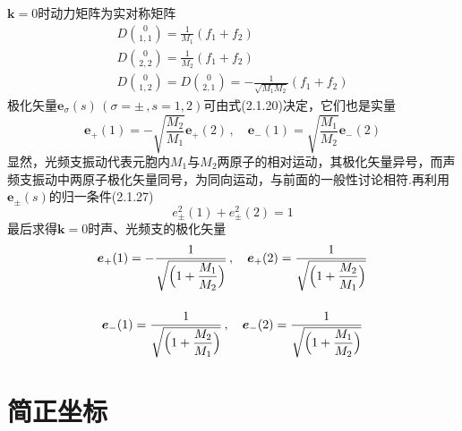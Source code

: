 $\boldsymbol{k}=0$时动力矩阵为实对称矩阵
\begin{equation}
\begin{gathered}
  D\binom{0}{1,1}=\frac{1}{M_1}(f_1+f_2)\\[1ex]
  D\binom{0}{2,2}=\frac{1}{M_2}(f_1+f_2)\\[1ex]
  D\binom{0}{1,2}=D\binom{0}{2,1}
  =-\frac{1}{\sqrt{M_1M_2}}(f_1+f_2)
\end{gathered}
\end{equation}
极化矢量$\boldsymbol{e}_{\sigma}(s)\,(\sigma=\pm\,,s=1,2)$可由式(2.1.20)决定，它们也是实量
\begin{equation}
  \boldsymbol{e}_{+}(1)=-\sqrt{\frac{M_2}{M_1}}\boldsymbol{e}_{+}(2)\,,
  \quad\boldsymbol{e}_{-}(1)=\sqrt{\frac{M_1}{M_2}}\boldsymbol{e}_{-}(2)
\end{equation}
显然，光频支振动代表元胞内$M_1$与$M_2$两原子的相对运动，其极化矢量异号，而声频支振动中两原子极化矢量同号，为同向运动，与前面的一般性讨论相符.再利用$\boldsymbol{e}_{\pm}(s)$的归一条件(2.1.27)
\begin{equation}
  e_{\pm}^2(1)+e_{\pm}^2(2)=1
\end{equation}
最后求得$\boldsymbol{k}=0$时声、光频支的极化矢量
\begin{equation}
\begin{gathered}
  \boldsymbol{e}_{+}(1)=-\frac{1}{\sqrt{\Bigl(1+\dfrac{M_1}{M_2}\Bigr)}}\,,
  \quad\boldsymbol{e}_{+}(2)=\frac{1}{\sqrt{\Bigl(1+\dfrac{M_2}{M_1}\Bigr)}}\\[3ex]
  \boldsymbol{e}_{-}(1)=\frac{1}{\sqrt{\Bigl(1+\dfrac{M_2}{M_1}\Bigr)}}\,,
  \quad\boldsymbol{e}_{-}(2)=\frac{1}{\sqrt{\Bigl(1+\dfrac{M_1}{M_2}\Bigr)}}
\end{gathered}
\end{equation}

\section{简正坐标}

